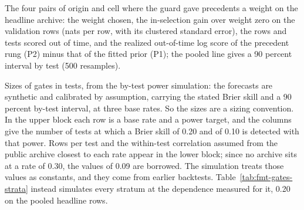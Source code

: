 \begin{table}[tp]\centering\scriptsize
\caption{The four pairs of origin and cell where the guard gave precedents a weight on the headline archive: the weight chosen, the in-selection gain over weight zero on the validation rows (nats per row, with its clustered standard error), the rows and tests scored out of time, and the realized out-of-time log score of the precedent rung (P2) minus that of the fitted prior (P1); the pooled line gives a 90 percent interval by test (500 resamples).}
\label{tab:guard-pairs}
\resizebox{\columnwidth}{!}{}
\end{table}

\begin{table}[tp]\centering\small
\caption{Sizes of gates in tests, from the by-test power simulation: the forecasts are synthetic and calibrated by assumption, carrying the stated Brier skill and a 90 percent by-test interval, at three base rates. So the sizes are a sizing convention. In the upper block each row is a base rate and a power target, and the columns give the number of tests at which a Brier skill of 0.20 and of 0.10 is detected with that power. Rows per test and the within-test correlation assumed from the public archive closest to each rate appear in the lower block; since no archive sits at a rate of 0.30, the values of 0.09 are borrowed. The simulation treats those values as constants, and they come from earlier backtests. Table~\ref{tab:fmt-gates-strata} instead simulates every stratum at the dependence measured for it, 0.20 on the pooled headline rows.}
\label{tab:gates}
\resizebox{\columnwidth}{!}{}

\vspace{0.5em}

\end{table}

